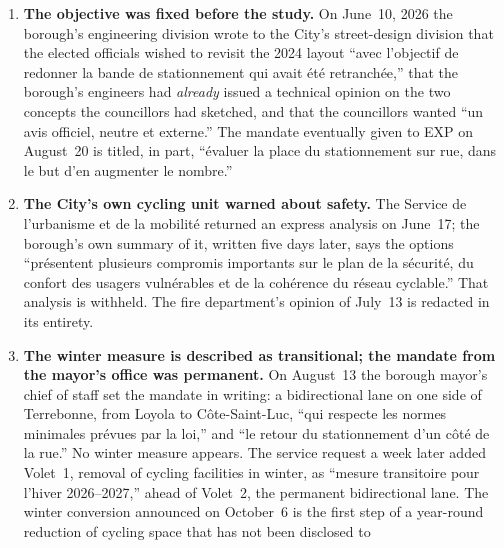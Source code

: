 \documentclass[11pt,letterpaper]{article}
\begin{document}
\begin{enumerate}[nosep]
  \item \begin{minipage}[t]{\linewidth}\textbf{The objective was fixed before the study.} On June~10, 2026 the
    borough's engineering division wrote to the City's street-design
    division that the elected officials wished to revisit the 2024 layout
    ``avec l'objectif de redonner la bande de stationnement qui avait \'et\'e
    retranch\'ee,'' that the borough's engineers had \emph{already} issued a
    technical opinion on the two concepts the councillors had sketched, and
    that the councillors wanted ``un avis officiel, neutre et externe.'' The
    mandate eventually given to EXP on August~20 is titled, in part,
    ``\'evaluer la place du stationnement sur rue, dans le but d'en augmenter
    le nombre.''\end{minipage}\vspace{0.35em}
\item \begin{minipage}[t]{\linewidth}\textbf{The City's own cycling unit warned about safety.} The
    Service de l'urbanisme et de la mobilit\'e returned an express analysis on
    June~17; the borough's own summary of it, written five days later, says
    the options ``pr\'esentent plusieurs compromis importants sur le plan de
    la s\'ecurit\'e, du confort des usagers vuln\'erables et de la coh\'erence
    du r\'eseau cyclable.'' That analysis is withheld. The fire department's
    opinion of July~13 is redacted in its entirety.\end{minipage}\vspace{0.35em}
\item \begin{minipage}[t]{\linewidth}\textbf{The winter measure is described as transitional; the
    mandate from the mayor's office was permanent.} On August~13 the borough
    mayor's chief of staff set the mandate in writing: a bidirectional lane
    on one side of Terrebonne, from Loyola to C\^ote-Saint-Luc, ``qui
    respecte les normes minimales pr\'evues par la loi,'' and ``le retour du
    stationnement d'un c\^ot\'e de la rue.'' No winter measure appears. The
    service request a week later added Volet~1, removal of cycling
    facilities in winter, as ``mesure transitoire pour l'hiver
    2026--2027,'' ahead of Volet~2, the permanent bidirectional lane. The
    winter conversion announced on October~6 is the first step of a
    year-round reduction of cycling space that has not been disclosed to

\end{minipage}
\end{enumerate}
\end{document}
